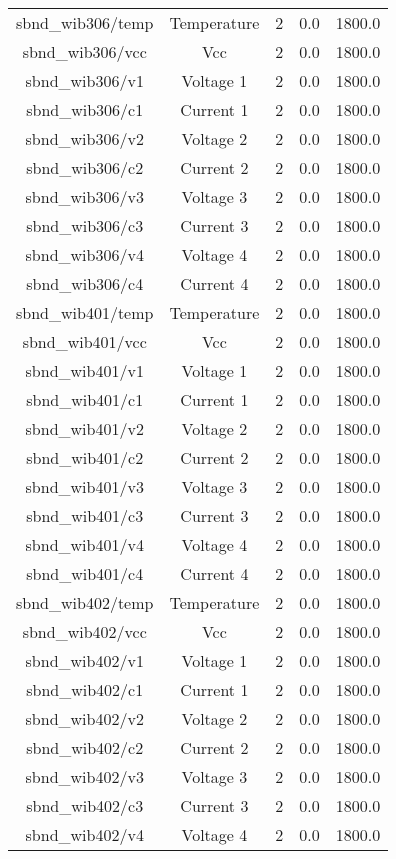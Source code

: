 \begin{center}
\begin{longtable}{c | c c c c }
sbnd\_wib306/temp & Temperature & 2 & 0.0 & 1800.0\\ 
sbnd\_wib306/vcc & Vcc & 2 & 0.0 & 1800.0\\ 
sbnd\_wib306/v1 & Voltage 1 & 2 & 0.0 & 1800.0\\ 
sbnd\_wib306/c1 & Current 1 & 2 & 0.0 & 1800.0\\ 
sbnd\_wib306/v2 & Voltage 2 & 2 & 0.0 & 1800.0\\ 
sbnd\_wib306/c2 & Current 2 & 2 & 0.0 & 1800.0\\ 
sbnd\_wib306/v3 & Voltage 3 & 2 & 0.0 & 1800.0\\ 
sbnd\_wib306/c3 & Current 3 & 2 & 0.0 & 1800.0\\ 
sbnd\_wib306/v4 & Voltage 4 & 2 & 0.0 & 1800.0\\ 
sbnd\_wib306/c4 & Current 4 & 2 & 0.0 & 1800.0\\ 
sbnd\_wib401/temp & Temperature & 2 & 0.0 & 1800.0\\ 
sbnd\_wib401/vcc & Vcc & 2 & 0.0 & 1800.0\\ 
sbnd\_wib401/v1 & Voltage 1 & 2 & 0.0 & 1800.0\\ 
sbnd\_wib401/c1 & Current 1 & 2 & 0.0 & 1800.0\\ 
sbnd\_wib401/v2 & Voltage 2 & 2 & 0.0 & 1800.0\\ 
sbnd\_wib401/c2 & Current 2 & 2 & 0.0 & 1800.0\\ 
sbnd\_wib401/v3 & Voltage 3 & 2 & 0.0 & 1800.0\\ 
sbnd\_wib401/c3 & Current 3 & 2 & 0.0 & 1800.0\\ 
sbnd\_wib401/v4 & Voltage 4 & 2 & 0.0 & 1800.0\\ 
sbnd\_wib401/c4 & Current 4 & 2 & 0.0 & 1800.0\\ 
sbnd\_wib402/temp & Temperature & 2 & 0.0 & 1800.0\\ 
sbnd\_wib402/vcc & Vcc & 2 & 0.0 & 1800.0\\ 
sbnd\_wib402/v1 & Voltage 1 & 2 & 0.0 & 1800.0\\ 
sbnd\_wib402/c1 & Current 1 & 2 & 0.0 & 1800.0\\ 
sbnd\_wib402/v2 & Voltage 2 & 2 & 0.0 & 1800.0\\ 
sbnd\_wib402/c2 & Current 2 & 2 & 0.0 & 1800.0\\ 
sbnd\_wib402/v3 & Voltage 3 & 2 & 0.0 & 1800.0\\ 
sbnd\_wib402/c3 & Current 3 & 2 & 0.0 & 1800.0\\ 
sbnd\_wib402/v4 & Voltage 4 & 2 & 0.0 & 1800.0\\ 

\end{longtable}
\end{center}
